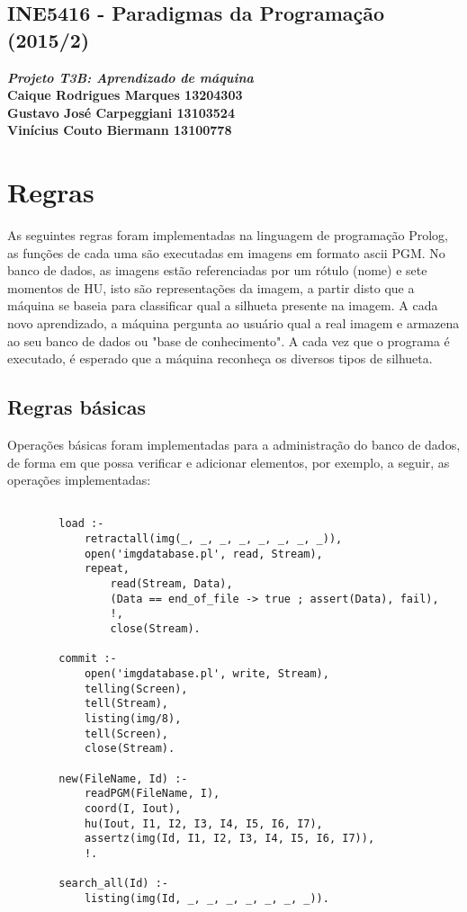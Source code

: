 \documentclass{article}
\begin{document}
\lstset{language=Prolog} %

\begin{center}
    \section*{INE5416 - Paradigmas da Programação (2015/2)}
    \textbf{\textit{Projeto T3B: Aprendizado de máquina} \\
    Caique Rodrigues Marques 13204303 \\
    Gustavo José Carpeggiani 13103524 \\
    Vinícius Couto Biermann  13100778}
\end{center}

\section*{Regras}
    As seguintes regras foram implementadas na linguagem de programação Prolog, as funções de cada uma são executadas em imagens em formato ascii PGM. No banco de dados, as imagens estão referenciadas por um rótulo (nome) e sete momentos de HU, isto são representações da imagem, a partir disto que a máquina se baseia para classificar qual a silhueta presente na imagem. A cada novo aprendizado, a máquina pergunta ao usuário qual a real imagem e armazena ao seu banco de dados ou "base de conhecimento". A cada vez que o programa é executado, é esperado que a máquina reconheça os diversos tipos de silhueta.
    
    \subsection*{Regras básicas}
        Operações básicas foram implementadas para a administração do banco de dados, de forma em que possa verificar e adicionar elementos, por exemplo, a seguir, as operações implementadas:
        \begin{lstlisting}[frame=single] % Trecho de código prolog
        
        load :-
            retractall(img(_, _, _, _, _, _, _, _)),
            open('imgdatabase.pl', read, Stream),
            repeat,
                read(Stream, Data),
                (Data == end_of_file -> true ; assert(Data), fail),
                !,
                close(Stream).

        commit :-
            open('imgdatabase.pl', write, Stream),
            telling(Screen),    
            tell(Stream),
            listing(img/8),
            tell(Screen),
            close(Stream).
        
        new(FileName, Id) :-
            readPGM(FileName, I),
            coord(I, Iout),
            hu(Iout, I1, I2, I3, I4, I5, I6, I7),
            assertz(img(Id, I1, I2, I3, I4, I5, I6, I7)),
            !.
        
        search_all(Id) :-
            listing(img(Id, _, _, _, _, _, _, _)).
        \end{lstlisting}
        
\end{document}
